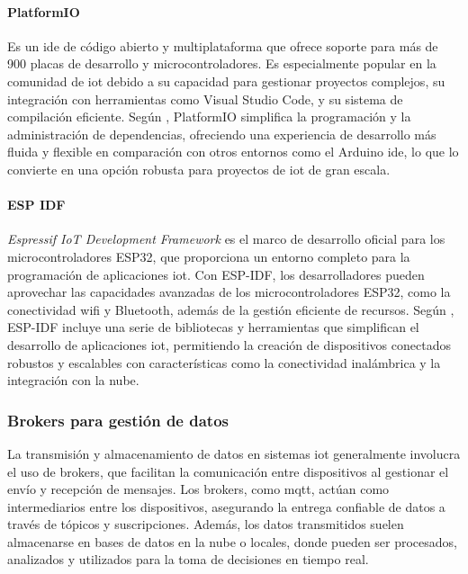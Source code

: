 \paragraph{PlatformIO}
Es un \acrshort{ide} de código abierto y multiplataforma que ofrece soporte para más de 900 placas de desarrollo y microcontroladores. Es especialmente popular en la comunidad de \acrshort{iot} debido a su capacidad para gestionar proyectos complejos, su integración con herramientas como Visual Studio Code, y su sistema de compilación eficiente. Según \cite{vallet2018platformio}, PlatformIO simplifica la programación y la administración de dependencias, ofreciendo una experiencia de desarrollo más fluida y flexible en comparación con otros entornos como el Arduino \acrshort{ide}, lo que lo convierte en una opción robusta para proyectos de \acrshort{iot} de gran escala.

\paragraph{ESP IDF}
\textit{Espressif IoT Development Framework} es el marco de desarrollo oficial para los microcontroladores ESP32, que proporciona un entorno completo para la programación de aplicaciones \acrshort{iot}. Con ESP-IDF, los desarrolladores pueden aprovechar las capacidades avanzadas de los microcontroladores ESP32, como la conectividad \acrshort{wifi} y Bluetooth, además de la gestión eficiente de recursos. Según \cite{espressif}, ESP-IDF incluye una serie de bibliotecas y herramientas que simplifican el desarrollo de aplicaciones \acrshort{iot}, permitiendo la creación de dispositivos conectados robustos y escalables con características como la conectividad inalámbrica y la integración con la nube.

\subsubsection{Brokers para gestión de datos}

La transmisión y almacenamiento de datos en sistemas \acrshort{iot} generalmente involucra el uso de brokers, que facilitan la comunicación entre dispositivos al gestionar el envío y recepción de mensajes. Los brokers, como \acrshort{mqtt}, actúan como intermediarios entre los dispositivos, asegurando la entrega confiable de datos a través de tópicos y suscripciones. Además, los datos transmitidos suelen almacenarse en bases de datos en la nube o locales, donde pueden ser procesados, analizados y utilizados para la toma de decisiones en tiempo real.

